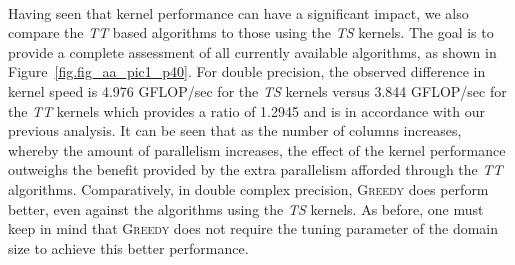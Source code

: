 \documentclass[a4paper,twopages]{article}
\newcommand{\Greedy}{\textsc{Greedy}\xspace}
\begin{document}
\begin{sidewaysfigure*}
\centering
\begin{minipage}{\linewidth}
\caption{\label{fig.fig_aa_pic2_p40} Overhead in terms of critical path length and time with respect to \Greedy (\Greedy = 1) }
\end{minipage}
\\
\begin{minipage}{\linewidth}

\caption{\label{fig.fig_aa_pic3_p40} Detailed view of the overhead in terms of critical path length and time with respect to \Greedy (\Greedy = 1) }
\end{minipage}
\end{sidewaysfigure*}

Having seen that kernel performance can have a significant impact,
we also compare the \emph{TT} based
algorithms to those using the \emph{TS} kernels. The goal is to provide
a complete assessment of all currently available
algorithms,  as shown
in Figure~\ref{fig.fig_aa_pic1_p40}.  For double precision, the observed
difference in kernel speed is 4.976 GFLOP/sec for the \emph{TS} kernels
versus 3.844 GFLOP/sec for the \emph{TT} kernels which provides a ratio of 1.2945 and is in accordance with
our previous analysis.  It can be seen that as the number of columns increases,
whereby the amount of parallelism increases, the effect of the kernel
performance outweighs the benefit provided by the extra parallelism afforded
through the \emph{TT} algorithms.  Comparatively, in
double complex precision, \Greedy does perform better, even against the
algorithms using the \emph{TS} kernels.  As before, one
must keep in mind that \Greedy does not require the tuning parameter of the
domain size to achieve this better performance.
\end{document}
